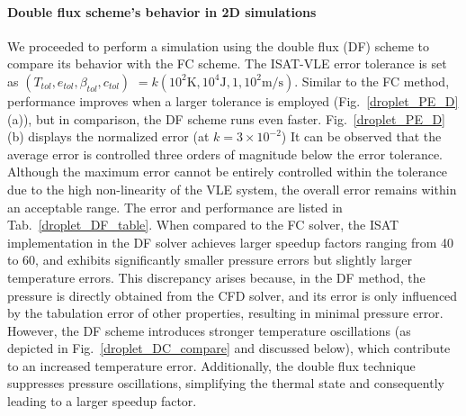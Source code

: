 \paragraph{Double flux scheme's behavior in 2D simulations}
\label{sec:DF}
We proceeded to perform a simulation using the double flux (DF) scheme to compare its behavior with the FC scheme. The ISAT-VLE error tolerance is set as $(T_{tol},e_{tol},\beta_{tol},c_{tol})$ $= k (10^2 \text{K}, 10^4 \text{J}, 1, 10^2\text{m/s})$. Similar to the FC method,  performance improves when a larger tolerance is employed (Fig.~\ref{droplet_PE_D}(a)), but in comparison, the DF scheme runs even faster. Fig.~\ref{droplet_PE_D}(b) displays the normalized error (at $k=3 \times 10^{-2}$) It can be observed that the average error is controlled three orders of magnitude below the error tolerance. Although the maximum error cannot be entirely controlled within the tolerance due to the high non-linearity of the VLE system, the overall error remains within an acceptable range. The error and performance are listed in Tab.~\ref{droplet_DF_table}. When compared to the FC solver, the ISAT implementation in the DF solver achieves larger speedup factors ranging from 40 to 60, and exhibits significantly smaller pressure errors but slightly larger temperature errors. This discrepancy arises because, in the DF method, the pressure is directly obtained from the CFD solver, and its error is only influenced by the tabulation error of other properties, resulting in minimal pressure error. However, the DF scheme introduces stronger temperature oscillations (as depicted in Fig.~\ref{droplet_DC_compare} and discussed below), which contribute to an increased temperature error. Additionally, the double flux technique suppresses pressure oscillations, simplifying the thermal state and consequently leading to a larger speedup factor.



